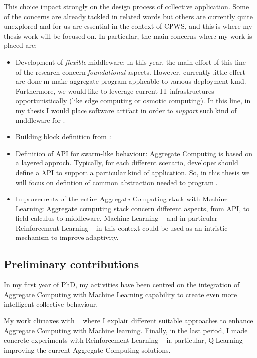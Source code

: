 \documentclass[11pt]{article}
\begin{document}
This choice impact strongly on the design process of collective application. Some of the concerns are already tackled in related words but others are currently quite unexplored and for us are essential in the context of CPWS, and this is where my thesis work will be focused on.
In particular, the main concerns where my work is placed are:
\begin{itemize}
	\item Development of \textit{flexible} middleware: In this year, the main effort of this line of the research concern \textit{foundational} aspects. However, currently little effert are done in make aggregate program applicable to various deployment kind. Furthermore, we would like to leverage current IT infrastructures opportunistically (like edge computing or osmotic computing). In this line, in my thesis I would place software artifact in order to \textit{support} such kind of middleware for \cpws.
	\item Building block definition from \cpws:
	\item Definition of API for swarm-like behaviour: Aggregate Computing is based on a layered approch. Typically, for each different scenario, developer should define a API to support a particular kind of application. So, in this thesis we will focus on defintion of common abstraction needed to program \cpws.
	\item Improvements of the entire Aggregate Computing stack with Machine Learning: Aggregate computing stack concern different aspects, from API, to field-calculus to middleware. Machine Learning -- and in particular Reinforcement Learning -- in this context could be used as an intristic mechanism to improve adaptivity.
\end{itemize}

\subsection{Preliminary contributions}
In my first year of PhD, my activities have been centred on
the integration of Aggregate Computing with Machine Learning capability to create even more
intelligent collective behaviour. 

My work climaxes with ~\cite{research} where I explain different suitable approaches to
enhance Aggregate Computing with Machine learning. Finally, in the last period, I made concrete
experiments with Reinforcement Learning -- in particular, Q-Learning \cite{} -- improving the current Aggregate Computing solutions.
\end{document}

